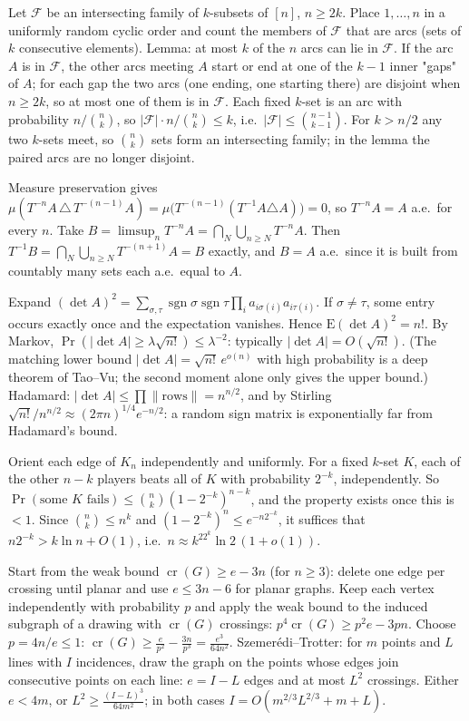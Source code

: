 \documentclass[11pt,a4paper]{article}
\begin{document}
 Let $\mathcal F$ be an intersecting family of $k$-subsets of $[n]$, $n\ge2k$. Place $1,\dots,n$ in a uniformly random cyclic order and count the members of $\mathcal F$ that are arcs (sets of $k$ consecutive elements).
 Lemma: at most $k$ of the $n$ arcs can lie in $\mathcal F$. If the arc $A$ is in $\mathcal F$, the other arcs meeting $A$ start or end at one of the $k-1$ inner "gaps" of $A$; for each gap the two arcs (one ending, one starting there) are disjoint when $n\ge2k$, so at most one of them is in $\mathcal F$.
 Each fixed $k$-set is an arc with probability $n/\binom nk$, so $|\mathcal F|\cdot n/\binom nk\le k$, i.e.\ $|\mathcal F|\le\binom{n-1}{k-1}$. For $k>n/2$ any two $k$-sets meet, so $\binom nk$ sets form an intersecting family; in the lemma the paired arcs are no longer disjoint.

 Measure preservation gives $\mu(T^{-n}A\,\triangle\,T^{-(n-1)}A)=\mu\big(T^{-(n-1)}(T^{-1}A\triangle A)\big)=0$, so $T^{-n}A=A$ a.e.\ for every $n$.
 Take $B=\limsup_nT^{-n}A=\bigcap_{N}\bigcup_{n\ge N}T^{-n}A$. Then $T^{-1}B=\bigcap_N\bigcup_{n\ge N}T^{-(n+1)}A=B$ exactly, and $B=A$ a.e.\ since it is built from countably many sets each a.e.\ equal to $A$.

 Expand $(\det A)^2=\sum_{\sigma,\tau}\operatorname{sgn}\sigma\operatorname{sgn}\tau\prod_ia_{i\sigma(i)}a_{i\tau(i)}$. If $\sigma\ne\tau$, some entry occurs exactly once and the expectation vanishes. Hence $\mathrm E(\det A)^2=n!$.
 By Markov, $\Pr(|\det A|\ge\lambda\sqrt{n!})\le\lambda^{-2}$: typically $|\det A|=O(\sqrt{n!})$. (The matching lower bound $|\det A|=\sqrt{n!}\,e^{o(n)}$ with high probability is a deep theorem of Tao--Vu; the second moment alone only gives the upper bound.)
 Hadamard: $|\det A|\le\prod\|\text{rows}\|=n^{n/2}$, and by Stirling $\sqrt{n!}/n^{n/2}\approx(2\pi n)^{1/4}e^{-n/2}$: a random sign matrix is exponentially far from Hadamard's bound.

 Orient each edge of $K_n$ independently and uniformly. For a fixed $k$-set $K$, each of the other $n-k$ players beats all of $K$ with probability $2^{-k}$, independently.
 So $\Pr(\text{some }K\text{ fails})\le\binom nk(1-2^{-k})^{n-k}$, and the property exists once this is $<1$. Since $\binom nk\le n^k$ and $(1-2^{-k})^{n}\le e^{-n2^{-k}}$, it suffices that $n2^{-k}>k\ln n+O(1)$, i.e.\ $n\approx k^22^k\ln2\,(1+o(1))$.

 Start from the weak bound $\operatorname{cr}(G)\ge e-3n$ (for $n\ge3$): delete one edge per crossing until planar and use $e\le3n-6$ for planar graphs.
 Keep each vertex independently with probability $p$ and apply the weak bound to the induced subgraph of a drawing with $\operatorname{cr}(G)$ crossings: $p^4\operatorname{cr}(G)\ge p^2e-3pn$. Choose $p=4n/e\le1$: $\operatorname{cr}(G)\ge\frac{e}{p^2}-\frac{3n}{p^3}=\frac{e^3}{64n^2}$.
 Szemer\'edi--Trotter: for $m$ points and $L$ lines with $I$ incidences, draw the graph on the points whose edges join consecutive points on each line: $e=I-L$ edges and at most $L^2$ crossings. Either $e<4m$, or $L^2\ge\frac{(I-L)^3}{64m^2}$; in both cases $I=O(m^{2/3}L^{2/3}+m+L)$.
\end{document}
